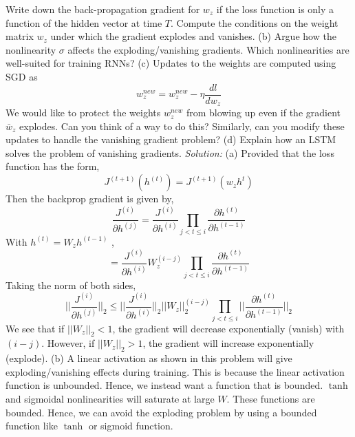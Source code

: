\documentclass[12pt]{article}
\begin{document}
Write down the back-propagation gradient for $w_z$ if the loss function is only a function of the hidden vector at time $T$.  Compute the conditions on the weight matrix $w_z$ under which the gradient explodes and vanishes. \newline
(b) Argue how the nonlinearity $\sigma$ affects the exploding/vanishing gradients. Which nonlinearities are well-suited for training RNNs? \newline 
(c) Updates to the weights are computed using SGD as 
$$w_z^{new}  =  w_z^{new} - \eta \frac{dl }{dw_{z} }    $$
We would like to protect the weights $w_z^{new}$ from blowing up even if the gradient $\bar{w}_{z}$ explodes. Can you think of a way to do this? Similarly, can you modify these updates to handle the vanishing gradient problem?\newline 
(d) Explain how an LSTM solves the problem of vanishing gradients.
\newline \newline 
\emph{Solution: } \newline   \newline 
(a) Provided that the loss function has the form,
$$ J^{(t+1)}   (h^{(t)}  )  =  J^{(t+1)}  ( w_z h^{t}  )  $$ 
Then the backprop gradient is given by, 
$$ \frac{ J^{(i)}  }{\partial h^{(j )}}  =\frac{ J^{(i)}  }{\partial h^{( i)}} \prod_{j < t \leq i } \frac{\partial h^{ (t )  }  }{\partial h^{ (t -1) } }      $$
With $h^{ (t) } = W_{z} h^{ (t-1)}$ ,  
$$ =\frac{ J^{(i)}  }{\partial h^{( i)}} W_{z}^{(i-j)} \prod_{j<t\leq i}  \frac{\partial h^{ (t )  }  }{\partial h^{ (t -1) } }      $$
Taking the norm of both sides, 
$$||\frac{ J^{(i)}  }{\partial h^{(j )}} ||_{2}  \leq || \frac{ J^{(i)}  }{\partial h^{( i)}} ||_{2}  || W_{z} ||^{(i-j)}_{2} \prod_{j < t \leq i } || \frac{\partial h^{ (t )  }  }{\partial h^{ (t -1) } }      ||_{2}    $$
We see that if $||W_z ||_{2} < 1$, the gradient will decrease exponentially (vanish) with $(i-j)$. However, if  $||W_z ||_{2} > 1$, the gradient will increase exponentially (explode). \newline \newline 
(b) A linear activation as shown in this problem will give exploding/vanishing effects during training. This is because the linear activation function is unbounded. Hence, we instead want a function that is bounded. $\tanh$ and sigmoidal nonlinearities will saturate at large $W$. These functions are bounded.  Hence, we can avoid the exploding problem by using a  bounded function like $\tanh$ or sigmoid function. \newline \newline 
\end{document}
